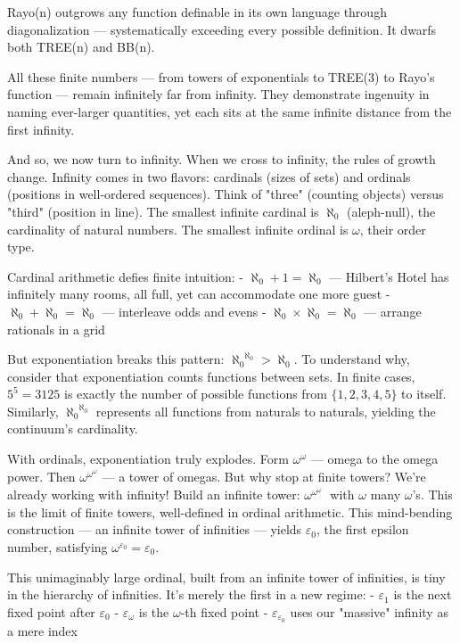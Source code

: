 Rayo(n) outgrows any function definable in its own language through diagonalization — systematically exceeding every possible definition. It dwarfs both TREE(n) and BB(n).

All these finite numbers — from towers of exponentials to TREE(3) to Rayo's function — remain infinitely far from infinity. They demonstrate ingenuity in naming ever-larger quantities, yet each sits at the same infinite distance from the first infinity.

And so, we now turn to infinity. When we cross to infinity, the rules of growth change. Infinity comes in two flavors: cardinals (sizes of sets) and ordinals (positions in well-ordered sequences). Think of "three" (counting objects) versus "third" (position in line). The smallest infinite cardinal is $\aleph_0$ (aleph-null), the cardinality of natural numbers. The smallest infinite ordinal is $\omega$, their order type.

Cardinal arithmetic defies finite intuition:
- $\aleph_0 + 1 = \aleph_0$ — Hilbert's Hotel has infinitely many rooms, all full, yet can accommodate one more guest
- $\aleph_0 + \aleph_0 = \aleph_0$ — interleave odds and evens
- $\aleph_0 \times \aleph_0 = \aleph_0$ — arrange rationals in a grid

But exponentiation breaks this pattern: ${\aleph_0}^{\aleph_0} > \aleph_0$. To understand why, consider that exponentiation counts functions between sets. In finite cases, $5^5 = 3125$ is exactly the number of possible functions from $\{1,2,3,4,5\}$ to itself. Similarly, ${\aleph_0}^{\aleph_0}$ represents all functions from naturals to naturals, yielding the continuum's cardinality. 

With ordinals, exponentiation truly explodes. Form $\omega^\omega$ — omega to the omega power. Then $\omega^{\omega^\omega}$ — a tower of omegas. But why stop at finite towers? We're already working with infinity! Build an infinite tower: $\omega^{\omega^{\omega^{\cdot^{\cdot^{\cdot}}}}}$ with $\omega$ many $\omega$'s. This is the limit of finite towers, well-defined in ordinal arithmetic. This mind-bending construction — an infinite tower of infinities — yields $\varepsilon_0$, the first epsilon number, satisfying $\omega^{\varepsilon_0} = \varepsilon_0$.

This unimaginably large ordinal, built from an infinite tower of infinities, is tiny in the hierarchy of infinities. It's merely the first in a new regime:
- $\varepsilon_1$ is the next fixed point after $\varepsilon_0$
- $\varepsilon_\omega$ is the $\omega$-th fixed point
- $\varepsilon_{\varepsilon_0}$ uses our "massive" infinity as a mere index

